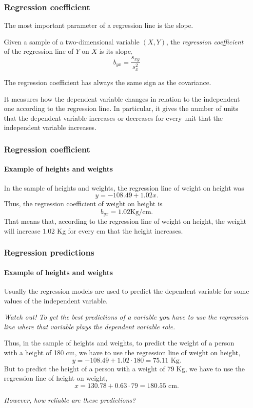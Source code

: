 \begin{frame}
\frametitle{Regression coefficient}
The most important parameter of a regression line is the slope. 

\begin{definition}
Given a sample of a two-dimensional variable $(X,Y)$, the \emph{regression coefficient} of the regression line of $Y$ on $X$ is its slope,
\[
b_{yx} = \frac{s_{xy}}{s_x^2}
\]
\end{definition}

The regression coefficient has always the same sign as the covariance. 

It measures how the dependent variable changes in relation to the independent one according to the regression line. 
In particular, it gives the number of units that the dependent variable increases or decreases for every unit that the independent variable increases. 
\end{frame}


\begin{frame}
\frametitle{Regression coefficient}
\framesubtitle{Example of heights and weights}
In the sample of heights and weights, the regression line of weight on height was 
\[
y=-108.49 +1.02 x.
\]
Thus, the regression coefficient of weight on height is
\[
b_{yx}= 1.02 \mbox{Kg/cm.}
\]
That means that, according to the regression line of weight on height, the weight will increase $1.02$ Kg for every cm that the height increases. 
\begin{center}

\end{center}
\end{frame}

\begin{frame}
\frametitle{Regression predictions}
\framesubtitle{Example of heights and weights}
Usually the regression models are used to predict the dependent variable for some values of the independent variable.
\begin{center}
\alert{\emph{Watch out! To get the best predictions of a variable you have to use the regression line where that variable plays the dependent variable role.}}
\end{center}

Thus, in the sample of heights and weights, to predict the weight of a person with a height of 180 cm, we have to use the regression line of weight on height,
\[
y = -108.49 + 1.02 \cdot 180  = 75.11 \mbox{ Kg}.
\]
But to predict the height of a person with a weight of 79 Kg, we have to use the regression line of height on weight, 
\[
x = 130.78 + 0.63\cdot 79 = 180.55 \mbox{ cm}.
\]
\begin{center}
\emph{However, how reliable are these predictions?}
\end{center}
\end{frame}



